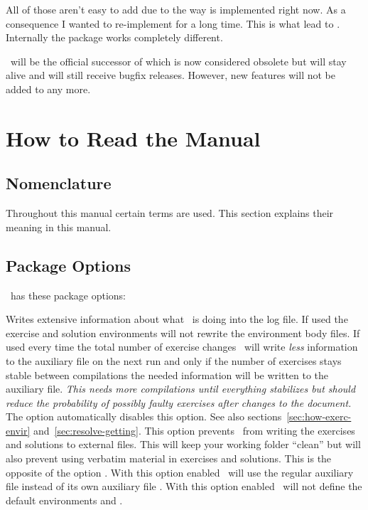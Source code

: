 \documentclass{xsim-manual}
\begin{document}
All of those aren't easy to add due to the way  is implemented
right now. As a consequence I wanted to re-implement  for a long
time.  This is what lead to \xsim.  Internally the package works completely
different.

\begin{bewareofthedog}
  \xsim\ will be the official successor of  which is now
  considered obsolete but will stay alive and will still receive bugfix
  releases. However, new features will not be added to  any
  more.
\end{bewareofthedog}

\section{How to Read the Manual}\label{sec:how-read-manual}

\subsection{Nomenclature}

Throughout this manual certain terms are used.  This section explains their
meaning in this manual.

\acuseall
\printacronyms[heading=none]

\subsection{Package Options}\label{sec:package-options}
\xsim\ has these package options:
\begin{options}
    Writes extensive information about what \xsim\ is doing into the log
    file.
    If used the exercise and solution environments will not rewrite the
    environment body files.
    If used every time the  total number of exercise changes \xsim\ will write
    \emph{less} information to the auxiliary file on the next run and only if
    the number of exercises stays stable between compilations the needed
    information will be written to the auxiliary file. \emph{This needs more
      compilations until everything stabilizes but should reduce the
      probability of possibly faulty exercises after changes to the document.}
    The  option automatically disables this option.  See also
    sections~\vref{sec:how-exerc-envir} and~\vref{sec:resolve-getting}.
    This option prevents \xsim\ from writing the exercises
    and solutions to external files.  This will keep your working folder
    ``clean'' but will also prevent using verbatim material in exercises and
    solutions.
    This is the opposite of the option .
    With this option enabled \xsim\ will use the regular
    auxiliary file  instead of its own auxiliary file
    .
    With this option enabled \xsim\ will not define the
    default environments  and .
\end{options}
\end{document}
